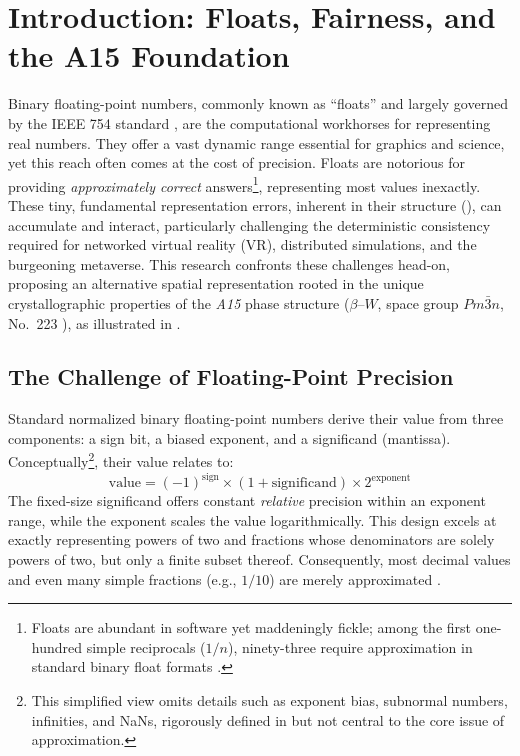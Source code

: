 \documentclass[10pt]{article}
\def\AAAB{\textit{A15}}
\def\betaW{$\beta$--$W$}
\begin{document}
\section{Introduction: Floats, Fairness, and the A15 Foundation}\label{sec:introduction}

Binary floating-point numbers, commonly known as ``floats'' and largely governed by the IEEE 754 standard \cite{IEEE754-2019}, are the computational workhorses for representing real numbers. They offer a vast dynamic range essential for graphics and science, yet this reach often comes at the cost of precision. Floats are notorious for providing \emph{approximately correct} answers\footnote{Floats are abundant in software yet maddeningly fickle; among the first one-hundred simple reciprocals ($1/n$), ninety-three require approximation in standard binary float formats \cite{Goldberg1991}.}, representing most values inexactly. These tiny, fundamental representation errors, inherent in their structure (), can accumulate and interact, particularly challenging the deterministic consistency required for networked virtual reality (VR), distributed simulations, and the burgeoning metaverse. This research confronts these challenges head-on, proposing an alternative spatial representation rooted in the unique crystallographic properties of the \AAAB{} phase structure (\betaW{}, space group $Pm\bar{3}n$, No.~223 \cite{ITCVolumeA2016}), as illustrated in .

\subsection{The Challenge of Floating-Point Precision}\label{subsec:intro-floats}

Standard normalized binary floating-point numbers derive their value from three components: a sign bit, a biased exponent, and a significand (mantissa). Conceptually\footnote{This simplified view omits details such as exponent bias, subnormal numbers, infinities, and NaNs, rigorously defined in \cite{IEEE754-2019} but not central to the core issue of approximation.}, their value relates to:
\begin{equation} \label{eq:float-representation}
    \text{value} = (-1)^{\text{sign}} \times (1 + \text{significand}) \times 2^{\text{exponent}}
\end{equation}
The fixed-size significand offers constant \emph{relative} precision within an exponent range, while the exponent scales the value logarithmically. This design excels at exactly representing powers of two and fractions whose denominators are solely powers of two, but only a finite subset thereof. Consequently, most decimal values and even many simple fractions (e.g., $1/10$) are merely approximated \cite{Goldberg1991}.
\end{document}
